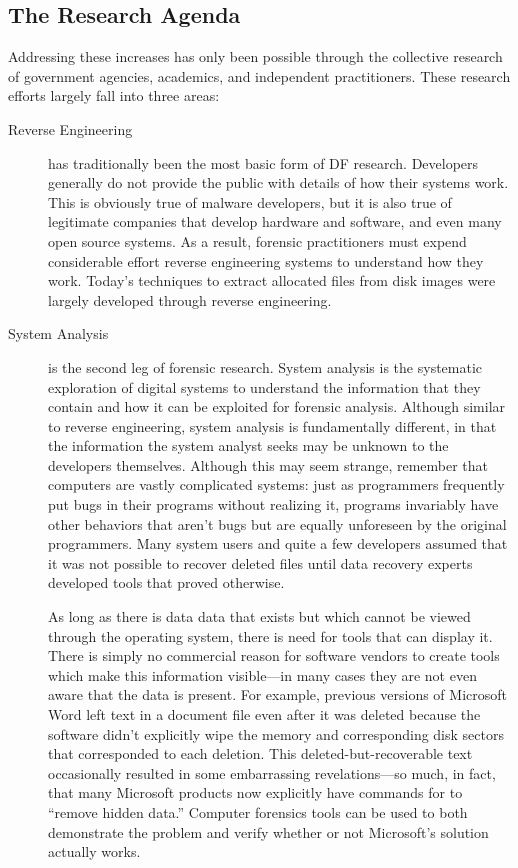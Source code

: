 \subsection{The Research Agenda}

  Addressing these increases has only been possible through the
  collective research of government agencies, academics, and
  independent practitioners. These research efforts largely fall into
  three areas:

\begin{description}
\item[Reverse Engineering] has traditionally been the most basic form
  of DF research. Developers generally do not provide the public
  with details of how their systems work. This is obviously true of
  malware developers, but it is also true of legitimate companies that
  develop hardware and software, and even many open source
  systems. As a result, forensic practitioners must expend
  considerable effort reverse engineering systems to  understand how
  they work.  Today's techniques to extract allocated files from disk
  images were largely developed through reverse engineering.

\item[System Analysis] is the second leg of forensic research. System
  analysis is the systematic exploration of digital systems to
  understand the information that they contain and how it can be
  exploited for forensic analysis. Although similar to reverse
  engineering, system analysis is fundamentally different, in that the
  information the system analyst seeks may be unknown to the
  developers themselves. Although this may seem strange, remember that
  computers are vastly complicated systems: just as programmers
  frequently put bugs in their programs without realizing it, programs
  invariably have other behaviors that aren't bugs but are equally
  unforeseen by the original programmers. Many system users and quite
  a few developers assumed that it was not possible to recover deleted
  files until data recovery experts developed tools that proved otherwise.

 As long as there is data data that exists but which cannot be viewed
 through the operating system, there is need for tools that can
 display it. There is simply no commercial reason for software vendors
 to create tools which make this information visible---in many cases
 they are not even aware that the data is present. For example,
 previous versions of Microsoft Word left text in a
 document file even after it was deleted because the software didn't
 explicitly wipe the memory and corresponding disk sectors that
 corresponded to each deletion. This deleted-but-recoverable text
 occasionally resulted in some embarrassing revelations---so much, in
 fact, that many Microsoft products now explicitly have commands for
 to ``remove hidden data.'' Computer forensics tools can be
 used to both demonstrate the problem and verify whether or not
 Microsoft's solution actually works.


\end{description}
